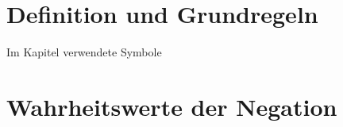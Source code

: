 \documentclass[main.tex]{subfiles}
\begin{document}
\section{Definition und Grundregeln}

\begin{DeltaContext}{Im Kapitel verwendete Symbole}
\end{DeltaContext}


\begin{tabproofsplit}
  \proofpart{$\vdash$}
  \closeproofpart

  \proofpart{$\dashv$}
  \closeproofpart
\end{tabproofsplit}

\FormulaThmAuto[Wahrheit]{\top}
\begin{tabproof}
\end{tabproof}

\begin{tabproofsplit}
  \proofpart{$\vdash$}
    \proofstep{}{\top}{\FormulaRefAuto{\top}}
  \closeproofpart

  \proofpart{$\dashv$}
  \closeproofpart
\end{tabproofsplit}

\begin{tabproof}
  \proofstep{}{\top}{\FormulaRefAuto{\top}}
\end{tabproof}

\section{Wahrheitswerte der Negation}
\end{document}
